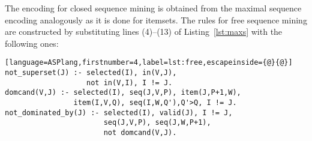 The encoding for closed sequence mining is obtained from the maximal sequence encoding analogously as it is done for itemsets. The rules for free sequence mining are constructed by substituting lines (4)--(13) of Listing~\ref{lst:maxs} with the following ones:

\begin{minipage}{\linewidth}
\small{\begin{lstlisting}[language=ASPlang,firstnumber=4,label=lst:free,escapeinside={@}{@}]
not_superset(J) :- selected(I), in(V,J), 
                   not in(V,I), I != J.
domcand(V,J) :- selected(I), seq(J,V,P), item(J,P+1,W), 
                item(I,V,Q), seq(I,W,Q'),Q'>Q, I != J.
not_dominated_by(J) :- selected(I), valid(J), I != J, 
                       seq(J,V,P), seq(J,W,P+1), 
                       not domcand(V,J). \end{lstlisting}}
\end{minipage}

